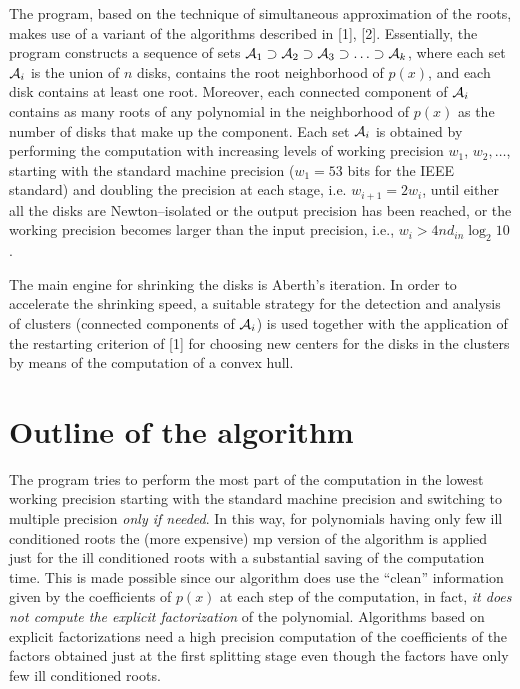 \documentclass{article}
\begin{document}
The program, based on the technique of simultaneous approximation of
the roots, makes use of a variant of the algorithms
described in [1], [2]. Essentially, the program constructs a sequence
of sets ${\cal A}_1 \supset {\cal A}_2 \supset {\cal A}_3 \supset
\ldots \supset{\cal A}_k$, where each set ${\cal A}_i$ is the union of
$n$ disks, contains the root neighborhood of $p(x)$, and each disk
contains at least one root. Moreover, each connected component of
${\cal A}_i$ contains as many roots of any polynomial in the
neighborhood of $p(x)$ as the number of disks that make up the
component.  Each set ${\cal A}_i$ is obtained by performing the
computation with increasing levels of working precision $w_1$, $w_2,
\ldots$, starting with the standard machine precision ($w_1=53$ bits
for the IEEE standard) and doubling the precision at each stage,
i.e. $w_{i+1}=2w_i$, until either all the disks are Newton--isolated
or the output precision has been reached, or the working precision
becomes larger than the input precision, i.e., $w_i>4 n d_{in}\log_2
10$.

The main engine for shrinking the disks is Aberth's iteration.  In
order to accelerate the shrinking speed, a suitable strategy for the
detection and analysis of clusters (connected components of ${\cal
A}_i$) is used together with the application of the restarting
criterion of [1] for choosing new centers for the disks in the
clusters by means of the computation of a convex hull.
 
\section{Outline of the algorithm}
The program tries to perform the most part of the computation in the
lowest working precision starting with the standard machine precision
and switching to multiple precision {\it only if needed}.  In this way,
for polynomials having only few ill conditioned roots the (more
expensive) mp version of the algorithm is applied just for the ill
conditioned roots with a substantial saving of the computation time.
This is made possible since our algorithm does use the ``clean'' 
information given by the coefficients of $p(x)$ at each step
of the computation, in fact, {\em it does not compute the explicit
factorization} of the polynomial.  Algorithms based on explicit
factorizations need a high precision computation of the coefficients
of the factors obtained just at the first splitting stage even though
the factors have only few ill conditioned roots.
\end{document}
